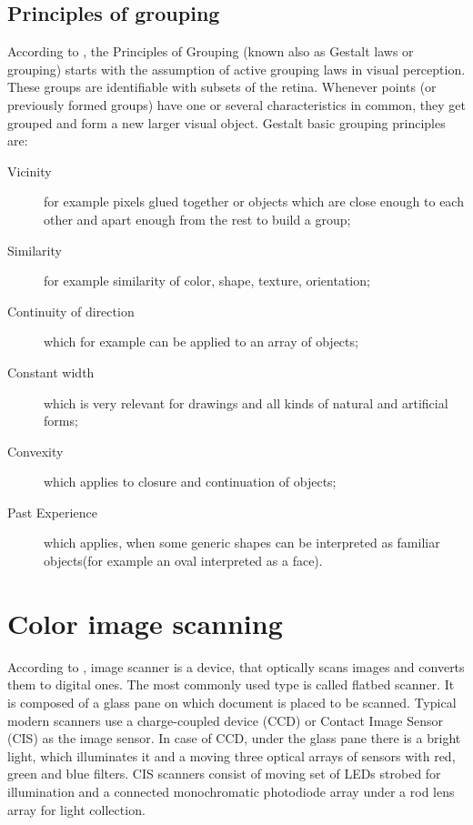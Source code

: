 \documentclass[a4paper,onecolumn,oneside,12pt]{memoir}
\begin{document}
\subsection{Principles of grouping}

According to \cite{gestaltTheory}, the Principles of Grouping (known also as Gestalt laws or
grouping) starts with the assumption of active grouping laws in visual perception. These groups are
identifiable with subsets of the retina. Whenever points (or previously formed groups) have one or
several characteristics in common, they get grouped and form a new larger visual object. Gestalt
basic grouping principles are:

\begin{description}
  \item[Vicinity] for example pixels glued together or objects which are close enough to each other
        and apart enough from the rest to build a group;
  \item[Similarity] for example similarity of color, shape, texture, orientation;
  \item[Continuity of direction] which for example can be applied to an array of objects;
  \item[Constant width] which is very relevant for drawings and all kinds of natural and artificial
        forms;
  \item[Convexity] which applies to closure and continuation of objects;
  \item[Past Experience] which applies, when some generic shapes can be interpreted as familiar
        objects(for example an oval interpreted as a face).
\end{description}

\section{Color image scanning}

According to \cite{imageScanner}, image scanner is a device, that optically scans images and
converts them to digital ones. The most commonly used type is called flatbed scanner. It is composed
of a glass pane on which document is placed to be scanned. Typical modern scanners use a 
charge-coupled device (CCD) or Contact Image Sensor (CIS) as the image sensor. In case of CCD, under
the glass pane there is a bright light, which illuminates it and a moving three optical arrays of
sensors with red, green and blue filters. CIS scanners consist of moving set of LEDs strobed for
illumination and a connected monochromatic photodiode array under a rod lens array for light
collection.
\end{document}
